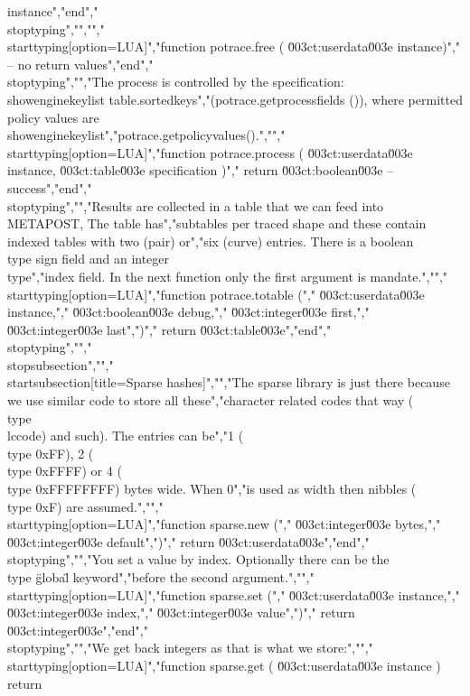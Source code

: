 instance","end","\\stoptyping","","","\\starttyping[option=LUA]","function potrace.free ( \u003ct:userdata\u003e instance)","    -- no return values","end","\\stoptyping","","The process is controlled by the specification: \\showenginekeylist {table.sortedkeys","(potrace.getprocessfields ())}, where permitted policy values are \\showenginekeylist","{potrace.getpolicyvalues()}.","","\\starttyping[option=LUA]","function potrace.process ( \u003ct:userdata\u003e instance, \u003ct:table\u003e specification )","    return \u003ct:boolean\u003e -- success","end","\\stoptyping","","Results are collected in a table that we can feed into \\METAPOST, The table has","subtables per traced shape and these contain indexed tables with two (pair) or","six (curve) entries. There is a boolean \\type {sign} field and an integer \\type","{index} field. In the next function only the first argument is mandate.","","\\starttyping[option=LUA]","function potrace.totable  (","    \u003ct:userdata\u003e instance,","    \u003ct:boolean\u003e  debug,","    \u003ct:integer\u003e  first,","    \u003ct:integer\u003e  last",")","    return \u003ct:table\u003e","end","\\stoptyping","","\\stopsubsection","","\\startsubsection[title=Sparse hashes]","","The sparse library is just there because we use similar code to store all these","character related codes that way (\\type {\\lccode}) and such). The entries can be","1 (\\type {0xFF}), 2 (\\type {0xFFFF}) or 4 (\\type {0xFFFFFFFF}) bytes wide. When 0","is used as width then nibbles (\\type {0xF}) are assumed.","","\\starttyping[option=LUA]","function sparse.new (","    \u003ct:integer\u003e bytes,","    \u003ct:integer\u003e default",")","    return \u003ct:userdata\u003e","end","\\stoptyping","","You set a value by index. Optionally there can be the \\type {\"global\"} keyword","before the second argument.","","\\starttyping[option=LUA]","function sparse.set (","    \u003ct:userdata\u003e instance,","    \u003ct:integer\u003e  index,","    \u003ct:integer\u003e  value",")","    return \u003ct:integer\u003e","end","\\stoptyping","","We get back integers as that is what we store:","","\\starttyping[option=LUA]","function sparse.get ( \u003ct:userdata\u003e instance ) return 